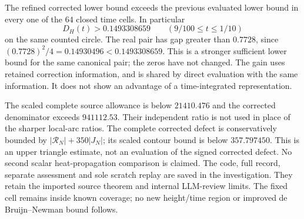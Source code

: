 The refined corrected lower bound exceeds the previous evaluated lower
bound in every one of the $64$ closed time cells. In particular
\begin{equation}
 D_H(t)>0.1493308659\qquad(9/100\le t\le1/10)
 \label{cr:pilot-margin}
\end{equation}
on the same counted circle. The real pair has gap greater than $0.7728$,
since $(0.7728)^2/4=0.14930496<0.1493308659$.
This is a stronger sufficient lower bound for the same canonical pair;
the zeros have not changed. The gain uses retained correction information,
and is shared by direct evaluation with the same information. It does not
show an advantage of a time-integrated representation.

The scaled complete source allowance is below $21410.476$ and the
corrected denominator exceeds $941112.53$. Their independent ratio is
not used in place of the sharper local-arc ratios. The complete corrected
defect is conservatively bounded by $|\mathcal R_N|+350|J_N|$;
its scaled contour bound is below $357.797450$. This is an upper
triangle estimate, not an evaluation of the signed corrected defect.
No second scalar heat-propagation comparison is claimed.
The code, full record, separate assessment and sole scratch replay are
saved in the investigation. They retain the imported source theorem and
internal LLM-review limits. The fixed cell remains inside known coverage;
no new height/time region or improved de Bruijn--Newman bound follows.
